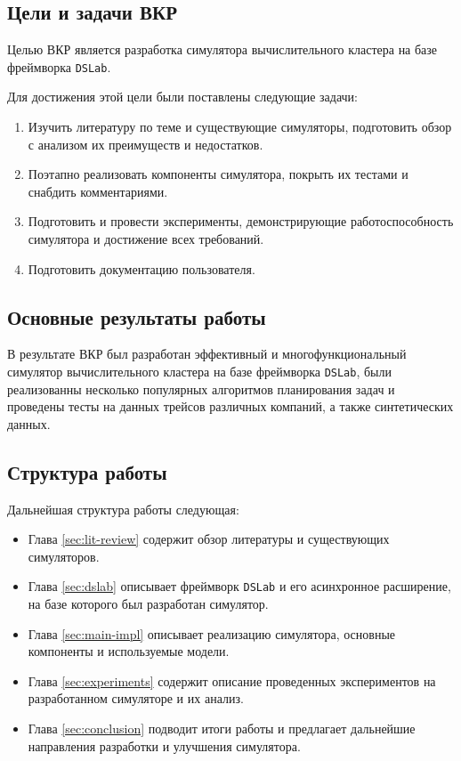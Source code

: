 \subsection{Цели и задачи ВКР}

Целью ВКР является разработка симулятора вычислительного кластера на базе фреймворка \texttt{DSLab}. 

Для достижения этой цели были поставлены следующие задачи: 
\begin{enumerate}
\item  Изучить литературу по теме и существующие симуляторы, подготовить обзор с анализом их преимуществ и недостатков.
\item Поэтапно реализовать компоненты симулятора, покрыть их тестами и снабдить комментариями.
\item Подготовить и провести эксперименты, демонстрирующие работоспособность симулятора и достижение всех требований.
\item Подготовить документацию пользователя.
\end{enumerate}

\subsection{Основные результаты работы}

В результате ВКР был разработан эффективный и многофункциональный симулятор вычислительного кластера на базе фреймворка \texttt{DSLab}, были реализованны несколько популярных алгоритмов планирования задач и проведены тесты на данных трейсов различных компаний, а также синтетических данных. 


\subsection{Структура работы}

Дальнейшая структура работы следующая: 
\begin{itemize}
    \item Глава \ref{sec:lit-review} содержит обзор литературы и существующих симуляторов.
    \item Глава \ref{sec:dslab} описывает фреймворк \texttt{DSLab} и его асинхронное расширение, на базе которого был разработан симулятор.
    \item Глава \ref{sec:main-impl} описывает реализацию симулятора, основные компоненты и используемые модели.
    \item Глава \ref{sec:experiments} содержит описание проведенных экспериментов на разработанном симуляторе и их анализ.
    \item Глава \ref{sec:conclusion} подводит итоги работы и предлагает дальнейшие направления разработки и улучшения симулятора.
\end{itemize} 


